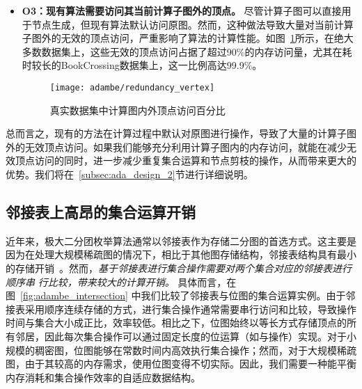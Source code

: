 \begin{itemize}
\item \textbf{O3：现有算法需要访问其当前计算子图外的顶点。} 尽管计算子图可以直接用于节点生成，但现有算法默认访问原图。然而，这种做法导致大量对当前计算子图外的无效的顶点访问，严重影响了算法的计算性能。如图~\ref{fig:ada_motivation_redundancy}所示，在绝大多数数据集上，这些无效的顶点访问占据了超过90\%的内存访问量，尤其在耗时较长的BookCrossing数据集上，这一比例高达99.9\%。

\begin{figure} [H]
	\centering
	\texttt{[image: adambe/redundancy\_vertex]}
	\caption{真实数据集中计算图内外顶点访问百分比  }
	\label{fig:ada_motivation_redundancy}
\end{figure}

\end{itemize}

总而言之，现有的方法在计算过程中默认对原图进行操作，导致了大量的计算子图外的无效顶点访问。如果我们能够充分利用计算子图内的内存访问，就能在减少无效顶点访问的同时，进一步减少重复集合运算和节点剪枝的操作，从而带来更大的优势。我们将在~\ref{subsec:ada_design_2}节进行详细说明。


\subsection{邻接表上高昂的集合运算开销}

% 

近年来，极大二分团枚举算法通常以邻接表作为存储二分图的首选方式。这主要是因为在处理大规模稀疏图的情况下，相比于其他图存储结构，邻接表结构具有最小的存储开销~\cite{PMBE20,ooMBE22}。然而，\emph{基于邻接表进行集合操作需要对两个集合对应的邻接表进行顺序串} \emph{行比较，带来较大的计算开销。}
具体而言，在图~\ref{fig:adambe_intersection} 中我们比较了邻接表与位图的集合运算实例。由于邻接表采用顺序连续存储的方式，进行集合操作通常需要串行访问和比较，导致操作时间与集合大小成正比，效率较低。相比之下，位图始终以等长方式存储顶点的所有邻居，因此每次集合操作可以通过固定长度的位运算（如与操作）实现。对于小规模的稠密图，位图能够在常数时间内高效执行集合操作；然而，对于大规模稀疏图，由于其较高的内存需求，使用位图变得不切实际。因此，我们需要一种能平衡内存消耗和集合操作效率的自适应数据结构。


